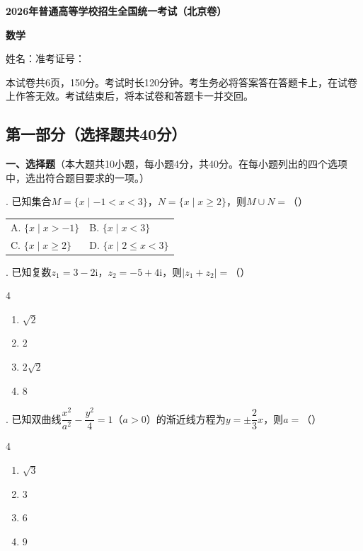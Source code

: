 \pagestyle{plain}

\begin{center}
  {\Large\bfseries 2026年普通高等学校招生全国统一考试（北京卷）\par}
  \vspace{0.5em}
  {\Large\bfseries 数\quad 学}
\end{center}

\noindent 姓名：\underline{\hspace{4cm}}\hfill 准考证号：\underline{\hspace{5cm}}

\medskip
\noindent 本试卷共6页，150分。考试时长120分钟。考生务必将答案答在答题卡上，在试卷上作答无效。考试结束后，将本试卷和答题卡一并交回。

\subsection*{第一部分（选择题\quad 共40分）}

\noindent\textbf{一、选择题}（本大题共10小题，每小题4分，共40分。在每小题列出的四个选项中，选出符合题目要求的一项。）

. 已知集合$M=\{x\mid-1<x<3\}$，$N=\{x\mid x\geqslant2\}$，则$M\cup N=$（\quad）
\begin{center}
\begin{tabular}{@{}p{}p{}@{}}
A. $\{x\mid x>-1\}$ & B. $\{x\mid x<3\}$ \\
C. $\{x\mid x\geqslant2\}$ & D. $\{x\mid2\leqslant x<3\}$
\end{tabular}
\end{center}

. 已知复数$z_1=3-2\mathrm{i}$，$z_2=-5+4\mathrm{i}$，则$|z_1+z_2|=$（\quad）
\begin{multicols}{4}
\begin{enumerate}[label=\Alph*.,leftmargin=*]
  \item $\sqrt2$
  \item $2$
  \item $2\sqrt2$
  \item $8$
\end{enumerate}
\end{multicols}

. 已知双曲线$\dfrac{x^2}{a^2}-\dfrac{y^2}{4}=1$（$a>0$）的渐近线方程为$y=\pm\dfrac23x$，则$a=$（\quad）
\begin{multicols}{4}
\begin{enumerate}[label=\Alph*.,leftmargin=*]
  \item $\sqrt3$
  \item $3$
  \item $6$
  \item $9$
\end{enumerate}
\end{multicols}

